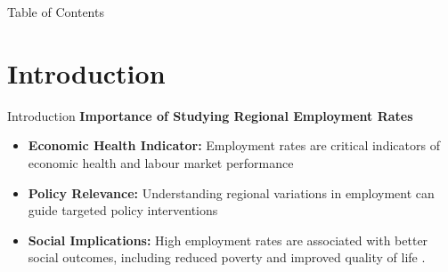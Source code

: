 \documentclass[10pt]{beamer}
\begin{document}



% 


\begin{frame}[plain]
\titlepage
\end{frame}

\begin{frame}{Table of Contents}
\tableofcontents
\end{frame}


\section{Introduction}
\begin{frame}{Introduction}
    \setlength{\parskip}{1em}  
    \textbf{Importance of Studying Regional Employment Rates}
    \begin{itemize}
        \item \textbf{Economic Health Indicator:} Employment rates are critical indicators of economic health and labour market performance
        \item \textbf{Policy Relevance:} Understanding regional variations in employment can guide targeted policy interventions 
        \item \textbf{Social Implications:} High employment rates are associated with better social outcomes, including reduced poverty and improved quality of life \parencite{moller2010}.
    \end{itemize}
\end{frame}
\end{document}
